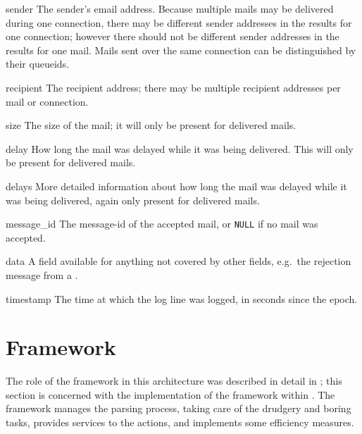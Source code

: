 \begin{boldeqlist}
    \item [sender] The sender's email address.  Because multiple mails may
        be delivered during one connection, there may be different sender
        addresses in the results for one connection; however there should
        not be different sender addresses in the results for one mail.
        Mails sent over the same connection can be distinguished by their
        queueids.

    \item [recipient] The recipient address; there may be multiple
        recipient addresses per mail or connection.

    \item [size] The size of the mail; it will only be present for
        delivered mails.

    \item [delay] How long the mail was delayed while it was being
        delivered.  This will only be present for delivered mails.

    \item [delays] More detailed information about how long the mail was
        delayed while it was being delivered, again only present for
        delivered mails.

    \item [message\_id] The message-id of the accepted mail, or
        \texttt{NULL} if no mail was accepted.

    \item [data] A field available for anything not covered by other
        fields, e.g.\ the rejection message from a \@.

    \item [timestamp] The time at which the log line was logged, in seconds
        since the epoch.

\end{boldeqlist}



\section{Framework}

The role of the framework in this architecture was described in detail in
; this section is concerned with the
implementation of the framework within \parsername{}.  The framework
manages the parsing process, taking care of the drudgery and boring tasks,
provides services to the actions, and implements some efficiency measures.

